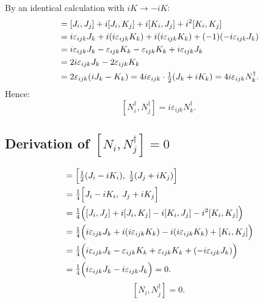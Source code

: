 By an identical calculation with $iK \to -iK$:
\begin{align}
  [J_i + iK_i,\; J_j + iK_j]
  &= [J_i, J_j]
     + i[J_i, K_j]
     + i[K_i, J_j]
     + i^2[K_i, K_j]
  \notag\\
  &= i\varepsilon_{ijk}J_k
     + i(i\varepsilon_{ijk}K_k)
     + i(i\varepsilon_{ijk}K_k)
     + (-1)(-i\varepsilon_{ijk}J_k)
  \notag\\
  &= i\varepsilon_{ijk}J_k
     - \varepsilon_{ijk}K_k
     - \varepsilon_{ijk}K_k
     + i\varepsilon_{ijk}J_k
  \notag\\
  &= 2i\varepsilon_{ijk}J_k - 2\varepsilon_{ijk}K_k
  \notag\\
  &= 2\varepsilon_{ijk}(iJ_k - K_k)
   = 4i\varepsilon_{ijk}\cdot\tfrac{1}{2}(J_k + iK_k)
   = 4i\varepsilon_{ijk}N_k^\dagger.
\end{align}
Hence:
\begin{equation}
  \boxed{[N_i^\dagger, N_j^\dagger] = i\varepsilon_{ijk}N_k^\dagger.}
\end{equation}

\subsection{Derivation of
  \texorpdfstring{$[N_i,N_j^\dagger]=0$}{[N,N†]=0}}

\begin{align}
  [N_i, N_j^\dagger]
  &= \Bigl[\tfrac{1}{2}(J_i - iK_i),\; \tfrac{1}{2}(J_j + iK_j)\Bigr]
  \notag\\
  &= \tfrac{1}{4}\Bigl[J_i - iK_i,\; J_j + iK_j\Bigr]
  \notag\\
  &= \tfrac{1}{4}\Bigl(
       [J_i, J_j] + i[J_i, K_j] - i[K_i, J_j] - i^2[K_i, K_j]
     \Bigr)
  \notag\\
  &= \tfrac{1}{4}\Bigl(
       i\varepsilon_{ijk}J_k
       + i(i\varepsilon_{ijk}K_k)
       - i(i\varepsilon_{ijk}K_k)
       + [K_i, K_j]
     \Bigr)
  \notag\\
  &= \tfrac{1}{4}\Bigl(
       i\varepsilon_{ijk}J_k
       - \varepsilon_{ijk}K_k
       + \varepsilon_{ijk}K_k
       + (-i\varepsilon_{ijk}J_k)
     \Bigr)
  \notag\\
  &= \tfrac{1}{4}\Bigl(i\varepsilon_{ijk}J_k - i\varepsilon_{ijk}J_k\Bigr) = 0.
\end{align}
\begin{equation}
  \boxed{[N_i, N_j^\dagger] = 0.}
\end{equation}

